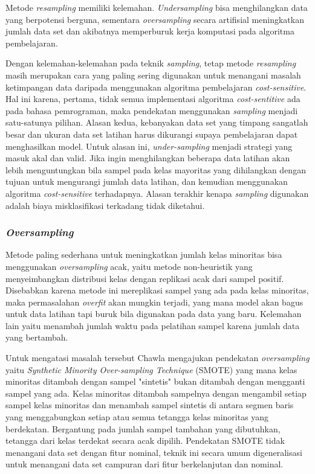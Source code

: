\documentclass[12pt,a4paper,titlepage]{article}
\begin{document}
Metode \textit{resampling} memiliki kelemahan.
\textit{Undersampling} bisa menghilangkan data yang berpotensi berguna, sementara \textit{oversampling} secara artifisial meningkatkan jumlah data set dan akibatnya memperburuk kerja komputasi pada algoritma pembelajaran.

Dengan kelemahan-kelemahan pada teknik \textit{sampling}, tetap metode \textit{resampling} masih merupakan cara yang paling sering digunakan untuk menangani masalah ketimpangan data daripada menggunakan algoritma pembelajaran \textit{cost-sensitive}.
Hal ini karena, pertama, tidak semua implementasi algoritma \textit{cost-sentitive} ada pada bahasa pemrograman, maka pendekatan menggunakan \textit{sampling} menjadi satu-satunya pilihan.
Alasan kedua, kebanyakan data set yang timpang sangatlah besar dan ukuran data set latihan harus dikurangi supaya pembelajaran dapat menghasilkan model.
Untuk alasan ini, \textit{under-sampling} menjadi strategi yang masuk akal dan valid.
Jika ingin menghilangkan beberapa data latihan akan lebih menguntungkan bila sampel pada kelas mayoritas yang dihilangkan dengan tujuan untuk mengurangi jumlah data latihan, dan kemudian menggunakan algoritma \textit{cost-sensitive} terhadapnya.
Alasan terakhir kenapa \textit{sampling} digunakan adalah biaya misklasifikasi terkadang tidak diketahui.

\subsubsection{\textit{Oversampling}}\label{subsubsec:oversampling}

Metode paling sederhana untuk meningkatkan jumlah kelas minoritas bisa menggunakan \textit{oversampling} acak, yaitu metode non-heuristik yang menyeimbangkan distribusi kelas dengan replikasi acak dari sampel positif.
Disebabkan karena metode ini mereplikasi sampel yang ada pada kelas minoritas, maka permasalahan \textit{overfit} akan mungkin terjadi, yang mana model akan bagus untuk data latihan tapi buruk bila digunakan pada data yang baru. 
Kelemahan lain yaitu menambah jumlah waktu pada pelatihan sampel karena jumlah data yang bertambah.

Untuk mengatasi masalah tersebut Chawla \cite{chawla2002smote} mengajukan pendekatan \textit{oversampling} yaitu \textit{Synthetic Minority Over-sampling Technique} (SMOTE) yang mana kelas minoritas ditambah dengan sampel "sintetis" bukan ditambah dengan mengganti sampel yang ada.
Kelas minoritas ditambah sampelnya dengan mengambil setiap sampel kelas minoritas dan menambah sampel sintetis di antara segmen baris yang menggabungkan setiap atau semua tetangga kelas minoritas yang berdekatan.
Bergantung pada jumlah sampel tambahan yang dibutuhkan, tetangga dari kelas terdekat secara acak dipilih.
Pendekatan SMOTE tidak menangani data set dengan fitur nominal, teknik ini secara umum digeneralisasi untuk menangani data set campuran dari fitur berkelanjutan dan nominal.
\end{document}
